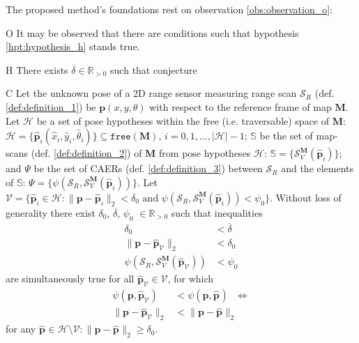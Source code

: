 The proposed method's foundations rest on observation \ref{obs:observation_o}:

\begin{customobs}{O}
  \label{obs:observation_o} It may be observed that there are conditions such
  that hypothesis \ref{hpt:hypothesis_h} stands true.
\end{customobs}

\begin{customhpt}{H}
  \label{hpt:hypothesis_h}
  There exists $\overline{\delta} \in \mathbb{R}_{> 0}$ such that conjecture

\end{customhpt}

\begin{customcnj}{C}
  \label{cnj:conjecture_c}
  Let the unknown pose of a 2D range sensor measuring range scan $\mathcal{S}_R$
  (def. \ref{def:definition_1}) be $\bm{p}(x,y,\theta)$ with respect to the
  reference frame of map $\bm{M}$.  Let $\mathcal{H}$ be a set of pose
  hypotheses within the free (i.e. traversable) space of $\bm{M}$:
  $\mathcal{H} = \{\hat{\bm{p}}_i(\hat{x}_i,\hat{y}_i,\hat{\theta}_i)\} \subseteq \texttt{free}(\bm{M})$, $i=0,1,\dots,|\mathcal{H}|-1$; $\mathbb{S}$
  be the set of map-scans (def. \ref{def:definition_2}) of $\bm{M}$ from pose
  hypotheses $\mathcal{H}$:
  $\mathbb{S} = \{\mathcal{S}_V^{\bm{M}}(\hat{\bm{p}}_i)\}$; and $\Psi$ be the
  set of CAERs (def. \ref{def:definition_3}) between $\mathcal{S}_R$ and the
  elements of $\mathbb{S}$:
  $\Psi = \{\psi(\mathcal{S}_R, \mathcal{S}_V^{\bm{M}}(\hat{\bm{p}}_i))\}$.
  Let $\mathcal{V} = \{\hat{\bm{p}}_i \in \mathcal{H}: \|\bm{p}-\hat{\bm{p}}_i\|_2 < \delta_0 \text{ and } \psi(\mathcal{S}_R,\mathcal{S}_V^{\bm{M}}(\hat{\bm{p}}_i)) < \psi_0\}$.
  Without loss of generality there exist $\delta_0$, $\overline{\delta}$, $\psi_0$ $\in \mathbb{R}_{> 0}$
  such that inequalities
  \begin{align}
    \delta_0 &< \overline{\delta} \nonumber \\
    \|\bm{p}-\hat{\bm{p}}_\mathcal{V}\|_2 &< \delta_0 \nonumber \\
    \psi(\mathcal{S}_R,\mathcal{S}_V^{\bm{M}}(\hat{\bm{p}}_\mathcal{V})) &< \psi_0 \nonumber
  \end{align}
  are simultaneously true for all $\hat{\bm{p}}_\mathcal{V} \in \mathcal{V}$,
  for which
  \begin{align}
    \psi(\bm{p}, \hat{\bm{p}}_\mathcal{V}) &< \psi(\bm{p}, \hat{\bm{p}}_{}) \ \ \ \Leftrightarrow \nonumber \\
    \|\bm{p}-\hat{\bm{p}}_\mathcal{V}\|_2 &< \|\bm{p}-\hat{\bm{p}}_{}\|_2 \nonumber
  \end{align}
  for any $\hat{\bm{p}}_{} \in {\mathcal{H} \setminus  \mathcal{V}}: \|\bm{p}-\hat{\bm{p}}_{}\|_2 \geq \delta_0$.
\end{customcnj}

